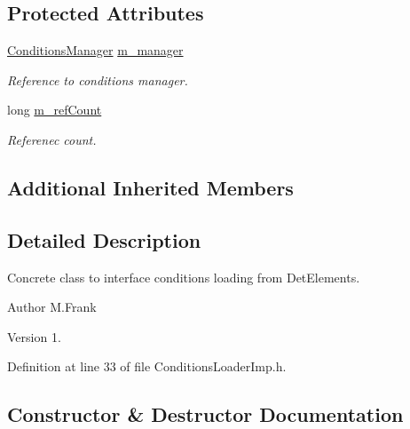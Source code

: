 \subsection*{Protected Attributes}
\begin{DoxyCompactItemize}
\item 
\hyperlink{class_d_d4hep_1_1_conditions_1_1_conditions_manager}{Conditions\+Manager} \hyperlink{class_d_d4hep_1_1_conditions_1_1_conditions_loader_imp_ab6ca31cc5ee9e155af821c6c755d60c6}{m\+\_\+manager}
\begin{DoxyCompactList}\small\item\em Reference to conditions manager. \end{DoxyCompactList}\item 
long \hyperlink{class_d_d4hep_1_1_conditions_1_1_conditions_loader_imp_aa108f7ae2788453c48cd29ad11596c76}{m\+\_\+ref\+Count}
\begin{DoxyCompactList}\small\item\em Referenec count. \end{DoxyCompactList}\end{DoxyCompactItemize}
\subsection*{Additional Inherited Members}


\subsection{Detailed Description}
Concrete class to interface conditions loading from Det\+Elements. 

\begin{DoxyAuthor}{Author}
M.\+Frank 
\end{DoxyAuthor}
\begin{DoxyVersion}{Version}
1. 
\end{DoxyVersion}


Definition at line 33 of file Conditions\+Loader\+Imp.\+h.



\subsection{Constructor \& Destructor Documentation}
\hypertarget{class_d_d4hep_1_1_conditions_1_1_conditions_loader_imp_a15a84941b8bf86ada6c80f0a0aaea082}{}\label{class_d_d4hep_1_1_conditions_1_1_conditions_loader_imp_a15a84941b8bf86ada6c80f0a0aaea082} 

